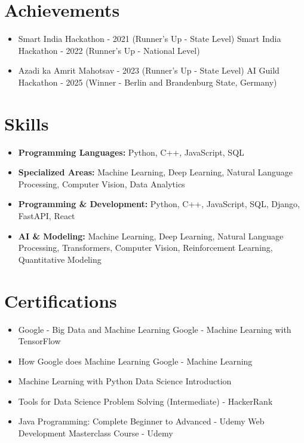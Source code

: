 \documentclass[a4paper,10pt]{article}
\begin{document}
\section*{Achievements}
\begin{itemize}
\item Smart India Hackathon - 2021 (Runner's Up - State Level) \hfill Smart India Hackathon - 2022 (Runner's Up - National Level)
\item Azadi ka Amrit Mahotsav - 2023 (Runner's Up - State Level) \hfill AI Guild Hackathon - 2025 (Winner - Berlin and Brandenburg State, Germany)
\end{itemize}

\section*{Skills}
\begin{itemize}
  \item \textbf{Programming Languages:} Python, C++, JavaScript, SQL
  \item \textbf{Specialized Areas:} Machine Learning, Deep Learning, Natural Language Processing, Computer Vision, Data Analytics
  \item \textbf{Programming \& Development:} Python, C++, JavaScript, SQL, Django, FastAPI, React
  \item \textbf{AI \& Modeling:} Machine Learning, Deep Learning, Natural Language Processing, Transformers, Computer Vision, Reinforcement Learning, Quantitative Modeling
\end{itemize}

\section*{Certifications}
\begin{itemize}
\item Google - Big Data and Machine Learning \hfill Google - Machine Learning with TensorFlow
\item How Google does Machine Learning \hfill Google - Machine Learning
\item Machine Learning with Python \hfill Data Science Introduction
\item Tools for Data Science \hfill Problem Solving (Intermediate) - HackerRank
\item Java Programming: Complete Beginner to Advanced - Udemy \hfill Web Development Masterclass Course - Udemy
\end{itemize}
\end{document}
